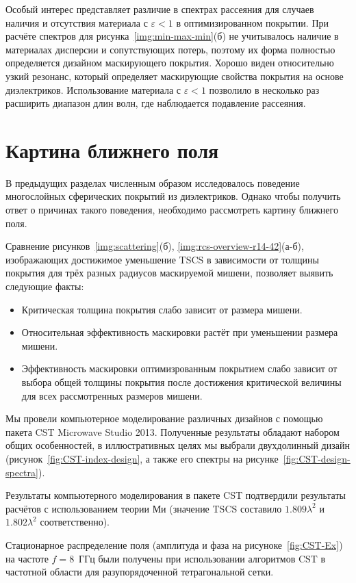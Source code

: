 Особый интерес представляет различие в спектрах рассеяния для случаев
наличия и отсутствия материала с ${\varepsilon<1}$ в оптимизированном
покрытии.  При расчёте спектров для рисунка~\ref{img:min-max-min}(б) не
учитывалось наличие в материалах дисперсии и сопутствующих потерь,
поэтому их форма полностью определяется дизайном маскирующего
покрытия. Хорошо виден относительно узкий резонанс, который определяет
маскирующие свойства покрытия на основе диэлектриков. Использование
материала с ${\varepsilon<1}$ позволило в несколько раз расширить
диапазон длин волн, где наблюдается подавление рассеяния. 

\section{Картина ближнего поля}\label{sec:near-field}

В предыдущих разделах численным образом исследовалось поведение
многослойных сферических покрытий из диэлектриков. Однако чтобы
получить ответ о причинах такого поведения, необходимо рассмотреть
картину ближнего поля.

Сравнение рисунков~\ref{img:scattering}(б),
\ref{img:rcs-overview-r14-42}(а-б), изображающих достижимое уменьшение
TSCS в зависимости от толщины покрытия для трёх разных радиусов
маскируемой мишени, позволяет выявить следующие факты:
\begin{itemize}
\item Критическая толщина покрытия слабо зависит от размера мишени.
\item Относительная эффективность маскировки растёт при уменьшении
  размера мишени.
\item Эффективность маскировки оптимизрованным покрытием слабо зависит
  от выбора общей толщины покрытия после достижения критической
  величины для всех рассмотренных размеров мишени.   
\end{itemize}


Мы провели компьютерное моделирование различных дизайнов с помощью
пакета CST Microwave Studio 2013.  Полученные результаты обладают
набором общих особенностей, в иллюстративных целях мы выбрали
двухдолинный дизайн (рисунок~\ref{fig:CST-index-design}, а также его
спектры на рисунке~\ref{fig:CST-design-spectra}).

Результаты компьютерного моделирования в пакете CST подтвердили
результаты расчётов с использованием теории Ми (значение TSCS
составило $1.809\lambda^2$ и $1.802\lambda^2$ соответственно).

Стационарное распределение поля (амплитуда  и фаза на
рисуноке~\ref{fig:CST-Ex}) на частоте ${f = 8}$~ГГц были получены при
использовании алгоритмов CST в частотной области для разупорядоченной
тетрагональной сетки.

